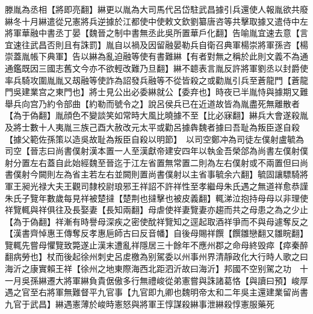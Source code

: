 滕胤為丞相【將即亮翻】綝更以胤為大司馬代呂岱駐武昌據引兵還使人報胤欲共廢綝冬十月綝遣從兄憲將兵逆據於江都使中使敕文欽劉纂唐咨等共擊取據又遣侍中左將軍華融中書丞丁晏【魏晉之制中書無丞此吳所置華戶化翻】告喻胤宜速去意【言宜速往武昌否則且有誅罰】胤自以禍及因留融晏勒兵自衛召典軍楊崇將軍孫咨【楊崇蓋胤帳下典軍】告以綝為亂迫融等使有書難綝【有者對無之稱於此則文義不為通通鑑既因三國志舊文今亦不欲輕改難乃旦翻】綝不聼表言胤反許將軍劉丞以封爵使率兵騎攻圍胤胤又刼融等使詐為詔發兵融等不從皆殺之或勸胤引兵至蒼龍門【蒼龍門吳建業宫之東門也】將士見公出必委綝就公【委弃也】時夜已半胤恃與據期又難舉兵向宫乃約令部曲【約勒而號令之】說呂侯兵已在近道故皆為胤盡死無離散者【為于偽翻】胤顔色不變談笑如常時大風比曉據不至【比必寐翻】綝兵大會遂殺胤及將士數十人夷胤三族己酉大赦改元太平或勸呂據犇魏者據曰吾耻為叛臣遂自殺【據父範佐孫策以造吳故耻為叛臣自殺以明節】　以司空鄭冲為司徒左僕射盧毓為司空【晉志曰尚書僕射漢本置一人至漢獻帝建安四年以執金吾榮郃為尚書左僕射僕射分置左右蓋自此始經魏至晉迄于江左省置無常置二則為左右僕射或不兩置但曰尚書僕射今闕則左為省主若左右並闕則置尚書僕射以主省事毓余六翻】毓固讓驃騎將軍王昶光禄大夫王觀司隸校尉琅邪王祥詔不許祥性至孝繼母朱氏遇之無道祥愈恭謹朱氏子覽年數歲每見祥被楚撻【楚荆也撻擊也被皮義翻】輒涕泣抱持母母以非理使祥覽輒與祥俱往及長娶妻【長知兩翻】母虐使祥妻覽妻亦趨而共之母患之為之少止【為于偽翻】祥漸有時譽母深疾之密使酖祥覽知之逕起取酒祥爭而不與母遽奪反之【漢書齊悼惠王傳奪反孝惠巵師古曰反音幡】自後母賜祥饌【饌雛戀翻又雛睆翻】覽輒先嘗母懼覽致斃遂止漢末遭亂祥隱居三十餘年不應州郡之命母終毁瘁【瘁秦醉翻病勞也】杖而後起徐州刺史呂䖍檄為别駕委以州事州界清靜政化大行時人歌之曰海沂之康實賴王祥【徐州之地東際海西北距泗沂故曰海沂】邦國不空别駕之功　十一月吳孫綝遷大將軍綝負貴倨傲多行無禮峻從弟憲嘗與誅諸葛恪【與讀曰預】峻厚遇之官至右將軍無難督平九官事【九官即九卿也魏明帝太和二年吳主還建業留尚書九官于武昌】綝遇憲薄於峻時憲怒與將軍王惇謀殺綝事泄綝殺惇憲服藥死

